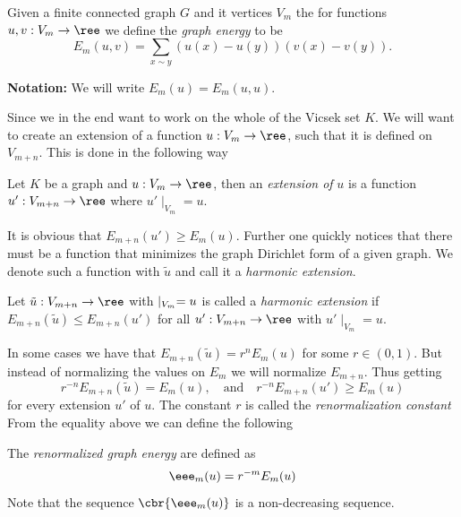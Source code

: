 \begin{defi}
	Given a finite connected graph $G$ and it vertices $V_m$ the for functions $u, v: V_m \to \ree$ we define the \emph{graph energy} to be
	\begin{equation}\label{graphEnergy}
		E_m(u,v) = \sum_{x \sim y} \left(u(x) - u(y) \right)(v(x)-v(y)).
	\end{equation}
\end{defi}
\noindent \textbf{Notation:} We will write $E_m(u) = E_m(u,u)$.

 Since we in the end want to work on the whole of the Vicsek set $K$. We will want to create an extension of a function $u: V_m \to \ree$, such that it is defined on $V_{m+n}$. This is done in the following way

\begin{defi}
	Let $K$ be a graph and $u: V_m \to \ree$, then an \emph{extension of} $u$ is a function \nl $u': V_{m+n} \to \ree$ where $u' \mid_{V_m} = u$.
\end{defi}

It is obvious that $E_{m+n}(u') \geq E_m(u)$. Further one quickly notices that there must be a function that minimizes the graph Dirichlet form of a given graph. We denote such a function with $\tilde{u}$ and call it a \emph{harmonic extension}.

\begin{defi}
	Let $\tilde{u}: V_{m+n} \to \ree$ with $\title{u} \mid_{V_m} = u$ is called a \emph{harmonic extension} if $E_{m+n}(\tilde{u}) \leq E_{m+n}(u')$ for all $u': V_{m+n} \to \ree$ with $u' \mid _{V_m} = u$.
\end{defi}

 In some cases we have that $E_{m+n}(\tilde{u}) = r^{n} E_{m}(u)$ for some $r \in (0,1)$. But instead of normalizing the values on $E_m$ we will normalize $E_{m+n}$. Thus  getting
\begin{equation}
	r^{-n} E_{m+n}(\tilde{u}) = E_m(u), \quad \text{and} \quad r^{-n} E_{m+n}(u') \geq E_m(u)
\end{equation}
for every extension $u'$ of $u$. The constant $r$ is called the \emph{renormalization constant} From the equality above we can define the following
\begin{defi}\label{renormalizedGraphEnergies}
	The \emph{renormalized graph energy} are defined as
	\begin{equation}
		\eee_{m}(u) = r^{-m}E_m(u)
	\end{equation}
	Note that the sequence $\cbr{\eee_{m}(u)}$ is a non-decreasing sequence. 
\end{defi}

